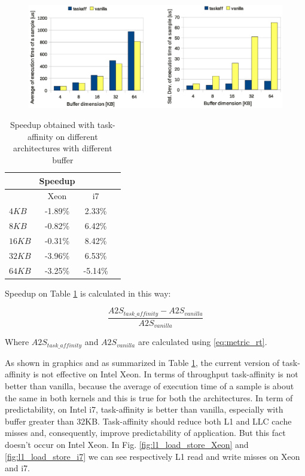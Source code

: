 \newpage

\begin{figure}[htbp]
\centering
\includegraphics[width=\widefigure]{images/time/time_avg_var_i7.eps}
\caption{}
\label{fig:avg_var_i7}
\end{figure}

\begin{table}[htbp]
\begin{center}
\begin{tabular}{l|c|c|c}
	\hline
	& Speedup \\ \hline
	& Xeon & i7 \\ \hline
	$4KB$  & -1.89\% & 2.33\% \\ \hline
	$8KB$  & -0.82\% & 6.42\% \\ \hline
	$16KB$ & -0.31\% & 8.42\% \\ \hline
	$32KB$ & -3.96\% & 6.53\% \\ \hline
	$64KB$ & -3.25\% & -5.14\% \\ \hline
\end{tabular}
\caption{Speedup obtained with task-affinity on different architectures with different buffer}
\label{tab:speedup_xeon_i7}
\end{center}
\end{table}

Speedup on Table \ref{tab:speedup_xeon_i7} is calculated in this way:

\begin{equation}
        \frac{A2S_{task\_affinity} - A2S_{vanilla}}{A2S_{vanilla}}
\label{eq:miss_rate}
\end{equation}

Where $A2S_{task\_affinity}$ and $A2S_{vanilla}$ are calculated using \ref{eq:metric_rt}.

As shown in graphics and as summarized in Table \ref{tab:speedup_xeon_i7}, the current version of task-affinity is not effective on Intel Xeon.
In terms of throughput task-affinity is not better than vanilla, because the average of execution time of a sample is about the same in both kernels 
and this is true for both the architectures. In term of predictability, on Intel i7, task-affinity is better than vanilla, especially with buffer 
greater than 32KB. Task-affinity should reduce both L1 and LLC cache misses and, consequently, improve predictability of application. But this fact 
doesn't occur on Intel Xeon. In Fig. \ref{fig:l1_load_store_Xeon} and \ref{fig:l1_load_store_i7} we can see respectively L1 read and write misses on 
Xeon and i7.

